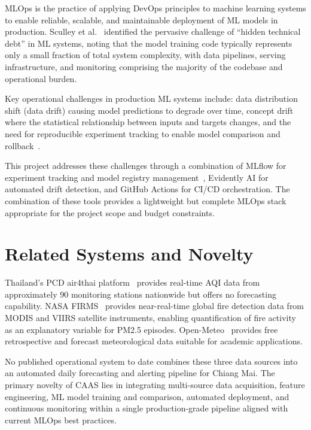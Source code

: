 \documentclass[12pt,a4paper]{report}
\begin{document}
MLOps is the practice of applying DevOps principles to machine learning systems to enable reliable, scalable, and maintainable deployment of ML models in production. Sculley et al.~\cite{sculley2015} identified the pervasive challenge of ``hidden technical debt'' in ML systems, noting that the model training code typically represents only a small fraction of total system complexity, with data pipelines, serving infrastructure, and monitoring comprising the majority of the codebase and operational burden.

Key operational challenges in production ML systems include: data distribution shift (data drift) causing model predictions to degrade over time, concept drift where the statistical relationship between inputs and targets changes, and the need for reproducible experiment tracking to enable model comparison and rollback~\cite{sculley2015}.

This project addresses these challenges through a combination of MLflow for experiment tracking and model registry management~\cite{zaharia2018mlflow}, Evidently AI for automated drift detection, and GitHub Actions for CI/CD orchestration. The combination of these tools provides a lightweight but complete MLOps stack appropriate for the project scope and budget constraints.

\section{Related Systems and Novelty}

Thailand's PCD air4thai platform~\cite{pcd2024} provides real-time AQI data from approximately 90 monitoring stations nationwide but offers no forecasting capability. NASA FIRMS~\cite{firms2024} provides near-real-time global fire detection data from MODIS and VIIRS satellite instruments, enabling quantification of fire activity as an explanatory variable for PM2.5 episodes. Open-Meteo~\cite{openmeteo2023} provides free retrospective and forecast meteorological data suitable for academic applications.

No published operational system to date combines these three data sources into an automated daily forecasting and alerting pipeline for Chiang Mai. The primary novelty of CAAS lies in integrating multi-source data acquisition, feature engineering, ML model training and comparison, automated deployment, and continuous monitoring within a single production-grade pipeline aligned with current MLOps best practices.

\end{document}
